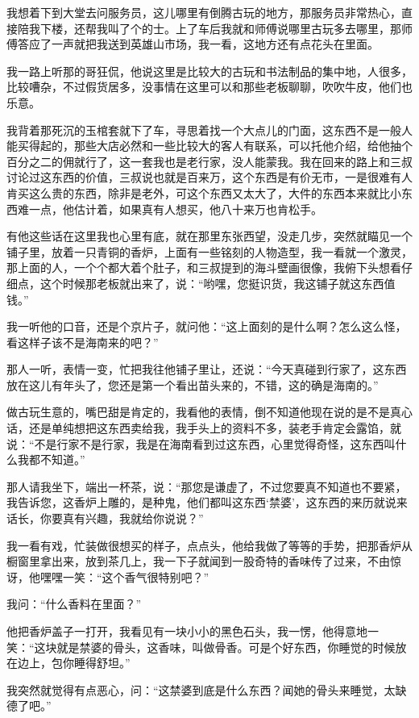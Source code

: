 我想着下到大堂去问服务员，这儿哪里有倒腾古玩的地方，那服务员非常热心，直接陪我下楼，还帮我叫了个的士。上了车后我就和师傅说哪里古玩多去哪里，那师傅答应了一声就把我送到英雄山市场，我一看，这地方还有点花头在里面。

我一路上听那的哥狂侃，他说这里是比较大的古玩和书法制品的集中地，人很多，比较嘈杂，不过假货居多，没事情在这里可以和那些老板聊聊，吹吹牛皮，他们也乐意。

我背着那死沉的玉棺套就下了车，寻思着找一个大点儿的门面，这东西不是一般人能买得起的，那些大店必然和一些比较大的客人有联系，可以托他介绍，给他抽个百分之二的佣就行了，这一套我也是老行家，没人能蒙我。我在回来的路上和三叔讨论过这东西的价值，三叔说也就是百来万，这个东西是有价无市，一是很难有人肯买这么贵的东西，除非是老外，可这个东西又太大了，大件的东西本来就比小东西难一点，他估计着，如果真有人想买，他八十来万也肯松手。

有他这些话在这里我也心里有底，就在那里东张西望，没走几步，突然就瞄见一个铺子里，放着一只青铜的香炉，上面有一些铭刻的人物造型，我一看就一个激灵，那上面的人，一个个都大着个肚子，和三叔提到的海斗壁画很像，我俯下头想看仔细点，这个时候那老板就出来了，说：“哟嘿，您挺识货，我这铺子就这东西值钱。”

我一听他的口音，还是个京片子，就问他：“这上面刻的是什么啊？怎么这么怪，看这样子该不是海南来的吧？”

那人一听，表情一变，忙把我往他铺子里让，还说：“今天真碰到行家了，这东西放在这儿有年头了，您还是第一个看出苗头来的，不错，这的确是海南的。”

做古玩生意的，嘴巴甜是肯定的，我看他的表情，倒不知道他现在说的是不是真心话，还是单纯想把这东西卖给我，我手头上的资料不多，装老手肯定会露馅，就说：“不是行家不是行家，我是在海南看到过这东西，心里觉得奇怪，这东西叫什么我都不知道。”

那人请我坐下，端出一杯茶，说：“那您是谦虚了，不过您要真不知道也不要紧，我告诉您，这香炉上雕的，是种鬼，他们都叫这东西‘禁婆’，这东西的来历就说来话长，你要真有兴趣，我就给你说说？”

我一看有戏，忙装做很想买的样子，点点头，他给我做了等等的手势，把那香炉从橱窗里拿出来，放到茶几上，我一下子就闻到一股奇特的香味传了过来，不由惊讶，他嘿嘿一笑：“这个香气很特别吧？”

我问：“什么香料在里面？”

他把香炉盖子一打开，我看见有一块小小的黑色石头，我一愣，他得意地一笑：“这块就是禁婆的骨头，这香味，叫做骨香。可是个好东西，你睡觉的时候放在边上，包你睡得舒坦。”

我突然就觉得有点恶心，问：“这禁婆到底是什么东西？闻她的骨头来睡觉，太缺德了吧。”

